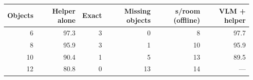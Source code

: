 \begin{tabular}{@{}rrrrrr@{}}
\toprule
Objects & Helper alone & Exact & Missing objects & s/room (offline) & VLM + helper \\
\midrule
6 & 97.3 & 3 & 0 & 8 & 97.7 \\
8 & 95.9 & 3 & 1 & 10 & 95.9 \\
10 & 90.4 & 1 & 5 & 13 & 89.5 \\
12 & 80.8 & 0 & 13 & 14 & — \\
\bottomrule
\end{tabular}
